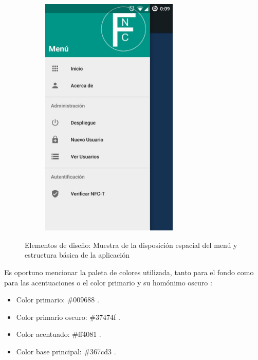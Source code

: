 \documentclass[../PFC.tex]{subfiles}
\begin{document}
\begin{figure}[H]
\begin{subfigure}{0.4\textwidth}
       \includegraphics[width=0.72\textwidth]{./img/menuDesplegado}
    \end{subfigure}   
  \caption{Elementos de diseño: Muestra de la disposición espacial del menú y estructura básica de la aplicación}
  \label{img:designElements}
\end{figure}

Es oportuno mencionar la paleta de colores utilizada, tanto para el fondo como para las acentuaciones o el color primario y su homónimo oscuro : 

\begin{itemize}
\item{Color primario: \#009688 .}
\item{Color primario oscuro: \#37474f .}
\item{Color acentuado: \#ff4081 .}
\item{Color base principal: \#367cd3 .}
\end{itemize}
\end{document}
